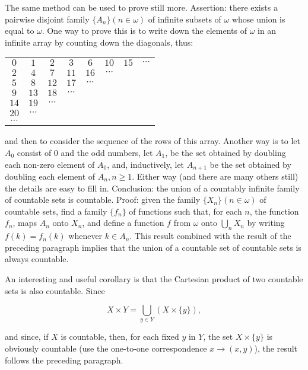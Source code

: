 The same method can be used to prove still more. Assertion: there exists a pairwise disjoint family $\{ A_{n} \} (n \in \omega)$ of infinite subsets of $\omega$ whose union is equal to $\omega$. One way to prove this is to write down the elements of $\omega$ in an infinite array by counting down the diagonals, thus: 

\begin{center}
\begin{tabular}{cccccccc}
$0$ & $1$ & $2$ & $3$ & $6$ & $10$ & $15$ & $\cdots$  \\
$2$ & $4$ & $7$ & $11$ & $16$ & $\cdots$ & & \\
$5$ & $8$ & $12$ & $17$ & $\cdots$ & & & \\
$9$ & $13$ & $18$ & $\cdots$ & & & & \\
$14$ & $19$ & $\cdots$ & & & & & \\
$20$ & $\cdots$ & & & & & & \\
$\cdots $ & & & & & & & 
\end{tabular}
\end{center}

and then to consider the sequence of the rows of this array. Another way is to let $A_{0}$ consist of 0 and the odd numbers, let $A_{1}$, be the set obtained by doubling each non-zero element of $A_{0}$, and, inductively, let $A_{n+1}$ be the set obtained by doubling each element of $A_{n}, n \ge 1$. Either way (and there are many others still) the details are easy to fill in. Conclusion: the union of a countably infinite family of countable sets is countable. Proof: given the family $\{ X_{n} \} (n \in \omega)$ of countable sets, find a family $\{ f_{n} \}$ of functions such that, for each $n$, the function $f_{n}$, maps $A_{n}$ onto $X_{n}$, and define a function $f$ from $\omega$ onto $\bigcup_{n} X_{n}$ by writing $f(k) = f_{n}(k)$ whenever $k \in A_{n}$. This result combined with the result of the preceding paragraph implies that the union of a countable set of countable sets is always countable. 

An interesting and useful corollary is that the Cartesian product of two countable sets is also countable. Since 

\begin{equation*}
X \times Y = \bigcup_{y \in Y}(X \times \{ y \}),
\end{equation*}

and since, if $X$ is countable, then, for each fixed $y$ in $Y$, the set $X \times \{ y \}$ is obviously countable (use the one-to-one correspondence $x \rightarrow (x,y)$), the result follows the preceding paragraph. 

